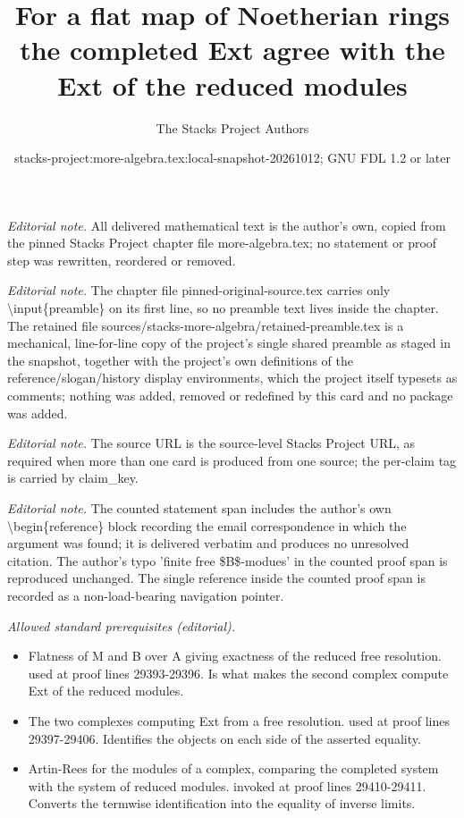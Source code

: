 \documentclass[10pt,a4paper]{amsart}
\title{For a flat map of Noetherian rings the completed Ext agree with the Ext of the reduced modules}
\author{The Stacks Project Authors}
\date{stacks-project:more-algebra.tex:local-snapshot-20261012; GNU FDL 1.2 or later}
\theoremstyle{plain}
\theoremstyle{definition}
\theoremstyle{remark}
\numberwithin{equation}{subsection}
\begin{document}
\maketitle
\setcounter{subsection}{1}
\noindent\textit{Editorial note.} All delivered mathematical text is the author's own, copied from the pinned Stacks Project chapter file more-algebra.tex; no statement or proof step was rewritten, reordered or removed.\par\medskip
\noindent\textit{Editorial note.} The chapter file pinned-original-source.tex carries only \textbackslash{}input\{preamble\} on its first line, so no preamble text lives inside the chapter. The retained file sources/stacks-more-algebra/retained-preamble.tex is a mechanical, line-for-line copy of the project's single shared preamble as staged in the snapshot, together with the project's own definitions of the reference/slogan/history display environments, which the project itself typesets as comments; nothing was added, removed or redefined by this card and no package was added.\par\medskip
\noindent\textit{Editorial note.} The source URL is the source-level Stacks Project URL, as required when more than one card is produced from one source; the per-claim tag is carried by claim\_key.\par\medskip
\noindent\textit{Editorial note.} The counted statement span includes the author's own \textbackslash{}begin\{reference\} block recording the email correspondence in which the argument was found; it is delivered verbatim and produces no unresolved citation. The author's typo 'finite free \$B\$-modues' in the counted proof span is reproduced unchanged. The single reference inside the counted proof span is recorded as a non-load-bearing navigation pointer.\par\medskip
\noindent\textit{Allowed standard prerequisites (editorial).}\begin{itemize}
\item Flatness of M and B over A giving exactness of the reduced free resolution. used at proof lines 29393-29396. Is what makes the second complex compute Ext of the reduced modules.
\item The two complexes computing Ext from a free resolution. used at proof lines 29397-29406. Identifies the objects on each side of the asserted equality.
\item Artin-Rees for the modules of a complex, comparing the completed system with the system of reduced modules. invoked at proof lines 29410-29411. Converts the termwise identification into the equality of inverse limits.
\end{itemize}\medskip
\end{document}
